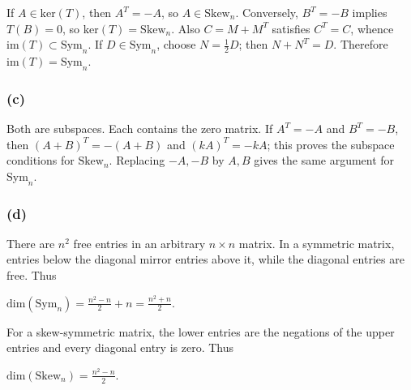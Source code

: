 If \(A \in \text{ker}(T)\), then \(A^{T} = - A\), so \(A \in \text{Skew}_{n}\). Conversely, \(B^{T} = - B\) implies \(T(B) = 0\), so \(\text{ker}(T) = \text{Skew}_{n}\). Also \(C = M + M^{T}\) satisfies \(C^{T} = C\), whence \(\text{im}(T) \subset \text{Sym}_{n}\). If \(D \in \text{Sym}_{n}\), choose \(N = \frac{1}{2}D\); then \(N + N^{T} = D\). Therefore \(\text{im}(T) = \text{Sym}_{n}\).

\subsubsection{(c)}

Both are subspaces. Each contains the zero matrix. If \(A^{T} = - A\) and \(B^{T} = - B\), then \(\left( {A + B} \right)^{T} = - \left( {A + B} \right)\) and \(\left( {kA} \right)^{T} = - kA\); this proves the subspace conditions for \(\text{Skew}_{n}\). Replacing \(- A, - B\) by \(A,B\) gives the same argument for \(\text{Sym}_{n}\).

\subsubsection{(d)}

There are \(n^{2}\) free entries in an arbitrary \(n \times n\) matrix. In a symmetric matrix, entries below the diagonal mirror entries above it, while the diagonal entries are free. Thus

\(\text{dim}\left( \text{Sym}_{n} \right) = \frac{n^{2} - n}{2} + n = \frac{n^{2} + n}{2}.\)

For a skew-symmetric matrix, the lower entries are the negations of the upper entries and every diagonal entry is zero. Thus

\(\text{dim}\left( \text{Skew}_{n} \right) = \frac{n^{2} - n}{2}.\)
